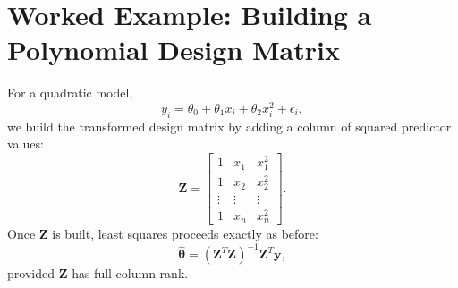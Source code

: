 {\section{Worked Example: Building a Polynomial Design Matrix}

For a quadratic model,
\begin{equation}
  y_i=\theta_0+\theta_1x_i+\theta_2x_i^2+\epsilon_i,
\end{equation}
we build the transformed design matrix by adding a column of squared predictor values:
\begin{equation}
  \mathbf{Z}=\begin{bmatrix}
  1 & x_1 & x_1^2\\
  1 & x_2 & x_2^2\\
  \vdots & \vdots & \vdots\\
  1 & x_n & x_n^2
  \end{bmatrix}.
\end{equation}
Once \(\mathbf{Z}\) is built, least squares proceeds exactly as before:
\begin{equation}
  \widehat{\boldsymbol{\theta}}=(\mathbf{Z}^T\mathbf{Z})^{-1}\mathbf{Z}^T\mathbf{y},
\end{equation}
provided \(\mathbf{Z}\) has full column rank.
}
